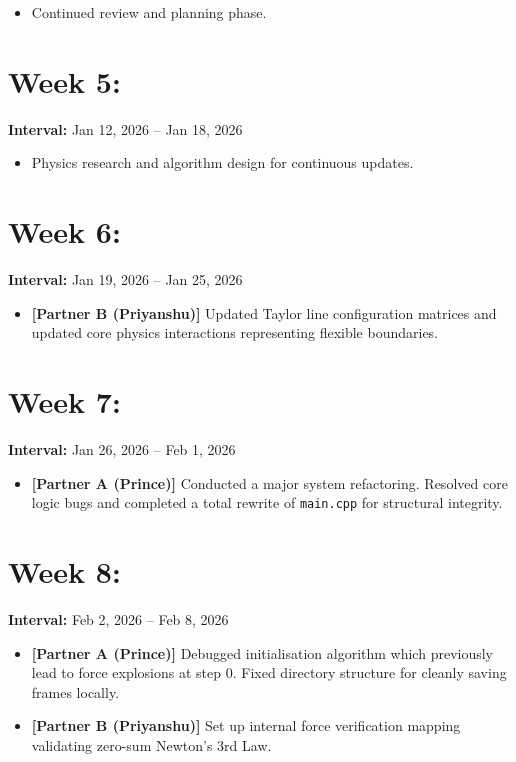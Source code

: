 \documentclass[11pt]{article}
\begin{document}
\begin{itemize}[noitemsep]
    \item Continued review and planning phase.
\end{itemize}

\section*{Week 5: }
\textbf{Interval:} Jan 12, 2026 -- Jan 18, 2026

\begin{itemize}[noitemsep]
    \item Physics research and algorithm design for continuous updates.
\end{itemize}

\section*{Week 6: }
\textbf{Interval:} Jan 19, 2026 -- Jan 25, 2026

\begin{itemize}[noitemsep]
    \item \textbf{[Partner B (Priyanshu)]} Updated Taylor line configuration matrices and updated core physics interactions representing flexible boundaries.
\end{itemize}

\section*{Week 7: }
\textbf{Interval:} Jan 26, 2026 -- Feb 1, 2026

\begin{itemize}[noitemsep]
    \item \textbf{[Partner A (Prince)]} Conducted a major system refactoring. Resolved core logic bugs and completed a total rewrite of \texttt{main.cpp} for structural integrity.
\end{itemize}

\section*{Week 8: }
\textbf{Interval:} Feb 2, 2026 -- Feb 8, 2026

\begin{itemize}[noitemsep]
    \item \textbf{[Partner A (Prince)]} Debugged initialisation algorithm which previously lead to force explosions at step 0. Fixed directory structure for cleanly saving frames locally.
    \item \textbf{[Partner B (Priyanshu)]} Set up internal force verification mapping validating zero-sum Newton's 3rd Law.
\end{itemize}
\end{document}
